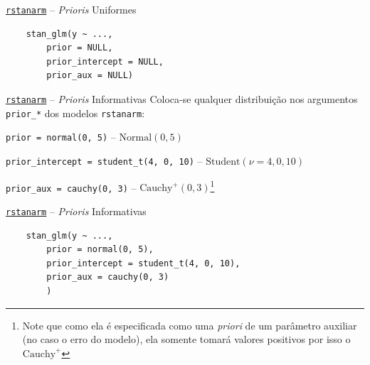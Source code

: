 \begin{frame}[fragile]{\href{http://mc-stan.org/rstanarm/}{\texttt{rstanarm}} -- \textit{Prioris} Uniformes}
    \begin{lstlisting}
    stan_glm(y ~ ...,
        prior = NULL,
        prior_intercept = NULL,
        prior_aux = NULL)
    \end{lstlisting}
\end{frame}

\begin{frame}{\href{http://mc-stan.org/rstanarm/}{\texttt{rstanarm}} -- \textit{Prioris} Informativas}
    Coloca-se qualquer distribuição nos argumentos
    \lstinline!prior_*! dos modelos \texttt{rstanarm}:
    \begin{vfilleditems}
        \item \lstinline!prior = normal(0, 5)! -- $\text{Normal}(0, 5)$
        \item \lstinline!prior_intercept = student_t(4, 0, 10)! -- $\text{Student}(\nu=4, 0, 10)$
        \item  \lstinline!prior_aux = cauchy(0, 3)! -- $\text{Cauchy}^+(0, 3)$\footnote{Note que como ela é especificada como uma \textit{priori} de um parâmetro auxiliar (no caso o erro do modelo), ela somente tomará valores positivos por isso o $\text{Cauchy}^+$}
    \end{vfilleditems}
\end{frame}

\begin{frame}[fragile]{\href{http://mc-stan.org/rstanarm/}{\texttt{rstanarm}} -- \textit{Prioris} Informativas}
    \begin{lstlisting}
    stan_glm(y ~ ...,
        prior = normal(0, 5),
        prior_intercept = student_t(4, 0, 10),
        prior_aux = cauchy(0, 3)
        )
    \end{lstlisting}
\end{frame}

